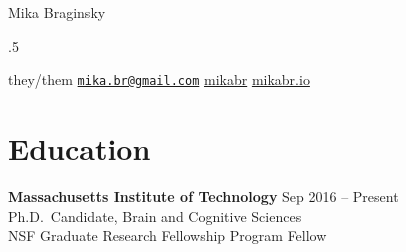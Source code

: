 \documentclass[11pt,]{article}
\newcommand{\iconPad}{.25mm}
\newcommand{\iconSep}{2.5mm}
\begin{document}
\centerline{\Huge Mika Braginsky}


\vspace{1.5 mm}





\moveleft.5\hoffset\centerline{ \scalebox{1}{\faCommentO}\hspace{\iconPad} they/them \hspace{\iconSep}
\scalebox{1}{\faEnvelopeO}\hspace{\iconPad} \href{mailto:mika.br@gmail.com}{\nolinkurl{mika.br@gmail.com}} \hspace{\iconSep}
\scalebox{1.1}{\faGithub}\hspace{\iconPad} \href{http://github.com/mikabr}{mikabr} \hspace{\iconSep} 
\scalebox{1}{\faExternalLink}\hspace{\iconPad} \href{http://mikabr.io}{mikabr.io}  \hspace{\iconSep} 
} %




\hypertarget{education}{%
\section{\texorpdfstring{\faGraduationCap \hspace{1pt}
Education}{ Education}}\label{education}}

\textbf{Massachusetts Institute of Technology} \hfill Sep 2016 --
Present\\
\hspace*{0.333em}\hspace*{0.333em}\hspace*{0.333em}\hspace*{0.333em}Ph.D.~Candidate,
Brain and Cognitive Sciences\\
\hspace*{0.333em}\hspace*{0.333em}\hspace*{0.333em}\hspace*{0.333em}NSF
Graduate Research Fellowship Program Fellow
\end{document}
